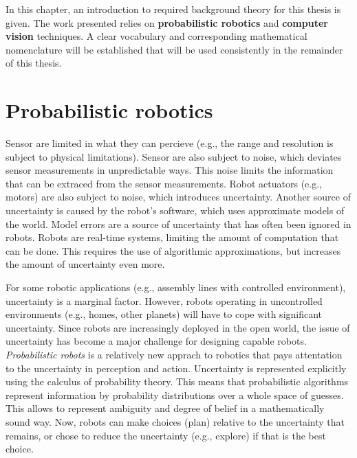 In this chapter, an introduction to required background theory for this thesis is given.
The work presented relies on \textbf{probabilistic robotics} and \textbf{computer vision} techniques.
A clear vocabulary and corresponding mathematical nomenclature will be established that will be used consistently in the remainder of this thesis.

\section{Probabilistic robotics}
Sensor are limited in what they can percieve (e.g., the range and resolution is subject to physical limitations).
Sensor are also subject to noise, which deviates sensor measurements in unpredictable ways.
This noise limits the information that can be extraced from the sensor measurements.
Robot actuators (e.g., motors) are also subject to noise, which introduces uncertainty.
Another source of uncertainty is caused by the robot's software, which uses approximate models of the world.
Model errors are a source of uncertainty that has often been ignored in robots.
Robots are real-time systems, limiting the amount of computation that can be done.
This requires the use of algorithmic approximations, but increases the amount of uncertainty even more.

For some robotic applications (e.g., assembly lines with controlled environment), uncertainty is a marginal factor.
However, robots operating in uncontrolled environments (e.g., homes, other planets) will have to cope with significant uncertainty.
Since robots are increasingly deployed in the open world, the issue of uncertainty has become a major challenge for designing capable robots.
\textit{Probabilistic robots} is a relatively new apprach to robotics that pays attentation to the uncertainty in perception and action.
Uncertainty is represented explicitly using the calculus of probability theory.
This means that probabilistic algorithms represent information by probability distributions over a whole space of guesses.
This allows to represent ambiguity and degree of belief in a mathematically sound way.
Now, robots can make choices (plan) relative to the uncertainty that remains, or chose to reduce the uncertainty (e.g., explore) if that is the best choice.


